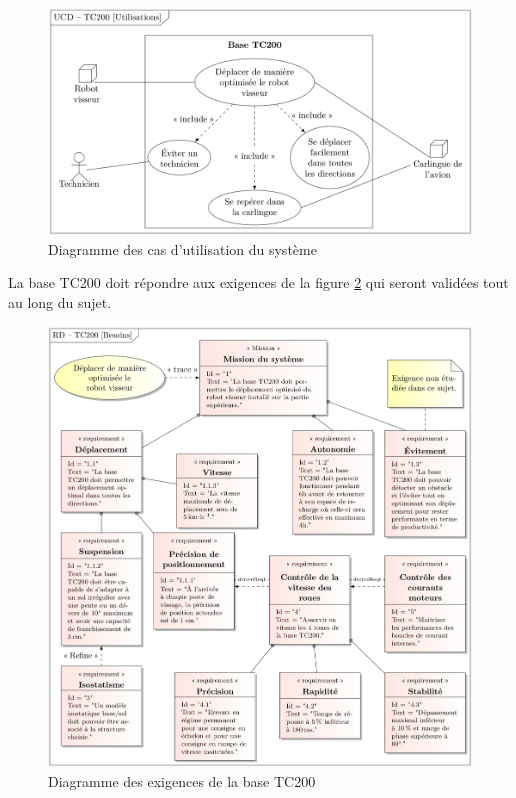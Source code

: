 \begin{figure}[!ht]
\begin{center}
 \includegraphics[width=0.9\linewidth]{img/fig04.png}
  \caption{Diagramme des cas d'utilisation du système}
\label{fig04}
 \end{center}
\end{figure}

La base TC200 doit répondre aux exigences de la figure \ref{fig05} qui seront validées tout au long du sujet.

\begin{figure}[!ht]
\begin{center}
 \includegraphics[width=0.9\linewidth]{img/fig05.png}
  \caption{Diagramme des exigences de la base TC200}
\label{fig05}
 \end{center}
\end{figure}

